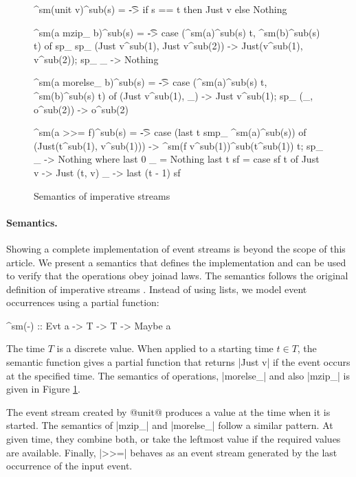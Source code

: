 \documentclass[preprint]{sigplanconf}
\begin{document}
\begin{figure}
\label{fig:imperativestream-semantics}
\begin{code}
^sm(unit v)^sub(s)       = \t -> if s == t then Just v else Nothing

^sm(a mzip_ b)^sub(s)     = \t -> case (^sm(a)^sub(s) t, ^sm(b)^sub(s) t) of
  sp_ sp_  (Just v^sub(1), Just v^sub(2)) -> Just(v^sub(1), v^sub(2)); sp_ _ -> Nothing

^sm(a morelse_ b)^sub(s)  = \t -> case (^sm(a)^sub(s) t, ^sm(b)^sub(s) t) of
           (Just v^sub(1), _) -> Just v^sub(1); sp_ (_, o^sub(2)) -> o^sub(2)

^sm(a >>= f)^sub(s)      = \t -> case (last t smp_ ^sm(a)^sub(s)) of
           (Just(t^sub(1), v^sub(1))) -> ^sm(f v^sub(1))^sub(t^sub(1)) t; sp_ _ -> Nothing
  where  last 0 _   = Nothing
         last t sf  = case sf t of  Just v -> Just (t, v)
                                    _ -> last (t - 1) sf
\end{code}
\caption{Semantics of imperative streams}
\end{figure}

\paragraph{Semantics.} Showing a complete implementation of event streams is beyond the scope of
this article. We present a semantics that defines the implementation and can be used to verify 
that the operations obey joinad laws. The semantics follows the original definition of imperative 
streams \cite{imperative-streams}. Instead of using lists, we model event occurrences using a 
partial function:

\begin{code}
^sm(-) :: Evt a -> T -> T -> Maybe a
\end{code}
The time $T$ is a discrete value. When applied to a starting time $t \in T$, the semantic function 
gives a partial function that returns |Just v| if the event occurs at the specified time.
The semantics of  operations, |morelse_| and also |mzip_| is given in 
Figure \ref{fig:imperativestream-semantics}.

The event stream created by @unit@ produces a value at the time when it is started.
The semantics of |mzip_| and |morelse_| follow a similar pattern. At given time, they combine 
both, or take the leftmost value if the required values are available. Finally, |>>=| behaves as 
an event stream generated by the last occurrence of the input event.
\end{document}
